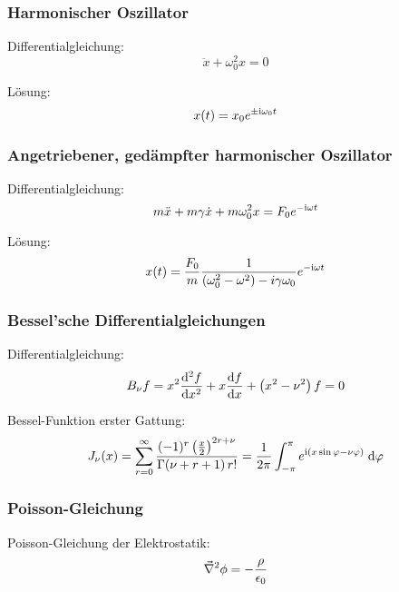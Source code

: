 		\subsubsection{Harmonischer Oszillator}
			\noindent
			Differentialgleichung:
			\begin{equation}
				\ddot{x}+\omega_0^2 x = 0
			\end{equation}

			\noindent
			Lösung:
			\begin{equation}
				x(t)=x_0 e^{\pm \mathrm{i}\omega_0 t}
			\end{equation}

		\subsubsection{Angetriebener, gedämpfter harmonischer Oszillator}
			\noindent
			Differentialgleichung:
			\begin{equation}
				m\ddot{x}+m\gamma\dot{x}+m\omega_0^2 x = F_0 e^{-\mathrm{i}\omega t}
			\end{equation}

			\noindent
			Lösung:
			\begin{equation}
				x(t) = \frac{F_0}{m} \frac{1}{\left(\omega_0^2-\omega^2\right)-i\gamma\omega_0} e^{-\mathrm{i}\omega t}
			\end{equation}

		\subsubsection{Bessel'sche Differentialgleichungen}
			\noindent
			Differentialgleichung:
			\begin{equation}
				B_\nu f = x^2\frac{\mathrm{d}^2 f}{\mathrm{d} x^2} + x\frac{\mathrm{d} f}{\mathrm{d} x}+\left(x^2-\nu^2\right)f = 0
			\end{equation}

			\noindent
			Bessel-Funktion erster Gattung:
			\begin{equation}
				J_\nu(x) = \sum_{r=0}^\infty \frac{(-1)^r\left(\frac{x}{2}\right)^{2r+\nu}}{\Gamma(\nu+r+1)\,r!} = \frac{1}{2\pi}\int_{-\pi}^{\pi} 	e^{\mathrm{i}(x\sin\varphi-\nu\varphi)}\;\mathrm{d}\varphi
			\end{equation}

		\subsubsection{Poisson-Gleichung}
			\noindent
			Poisson-Gleichung der Elektrostatik:
			\begin{equation}
				\vec{\nabla}^2\phi = -\frac{\rho}{\epsilon_0}
			\end{equation}

